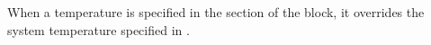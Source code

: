 When a temperature is specified in the  section of the
 block, it overrides the system temperature specified in
.





%


